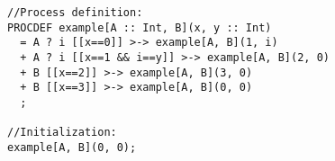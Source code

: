 \begin{lstlisting}
//Process definition:
PROCDEF example[A :: Int, B](x, y :: Int)
  = A ? i [[x==0]] >-> example[A, B](1, i)
  + A ? i [[x==1 && i==y]] >-> example[A, B](2, 0)
  + B [[x==2]] >-> example[A, B](3, 0)
  + B [[x==3]] >-> example[A, B](0, 0)
  ;

//Initialization:
example[A, B](0, 0);
\end{lstlisting}

